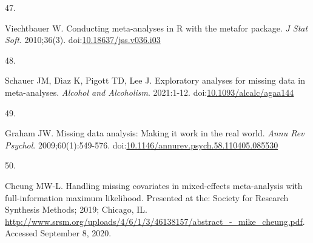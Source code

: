 \documentclass[
]{article}
\newlength{\cslhangindent}
\newlength{\csllabelwidth}
\newlength{\cslentryspacingunit} %
\newenvironment{CSLReferences}[2] %
 {%
  \setlength{\parindent}{0pt}
  \ifodd #1
  \let\oldpar\par
  \def\par{\hangindent=\cslhangindent\oldpar}
  \fi
  \setlength{\parskip}{#2\cslentryspacingunit}
 }%
 {}
\newcommand{\CSLLeftMargin}[1]{\parbox[t]{\csllabelwidth}{#1}}
\newcommand{\CSLRightInline}[1]{\parbox[t]{\linewidth - \csllabelwidth}{#1}\break}
\begin{document}
\begin{CSLReferences}{0}{0}
\leavevmode{}%
\CSLLeftMargin{47. }
\CSLRightInline{Viechtbauer W. Conducting meta-analyses in R with the metafor package. \emph{J Stat Soft}. 2010;36(3). doi:\href{https://doi.org/10.18637/jss.v036.i03}{10.18637/jss.v036.i03}}

\leavevmode{}%
\CSLLeftMargin{48. }
\CSLRightInline{Schauer JM, Dìaz K, Pigott TD, Lee J. Exploratory analyses for missing data in meta-analyses. \emph{Alcohol and Alcoholism}. 2021:1-12. doi:\href{https://doi.org/10.1093/alcalc/agaa144}{10.1093/alcalc/agaa144}}

\leavevmode{}%
\CSLLeftMargin{49. }
\CSLRightInline{Graham JW. Missing data analysis: Making it work in the real world. \emph{Annu Rev Psychol}. 2009;60(1):549-576. doi:\href{https://doi.org/10.1146/annurev.psych.58.110405.085530}{10.1146/annurev.psych.58.110405.085530}}

\leavevmode{}%
\CSLLeftMargin{50. }
\CSLRightInline{Cheung MW-L. Handling missing covariates in mixed-effects meta-analysis with full-information maximum likelihood. Presented at the: Society for Research Synthesis Methods; 2019; Chicago, IL. \url{http://www.srsm.org/uploads/4/6/1/3/46138157/abstract_-_mike_cheung.pdf}. Accessed September 8, 2020.}

\end{CSLReferences}
\end{document}
